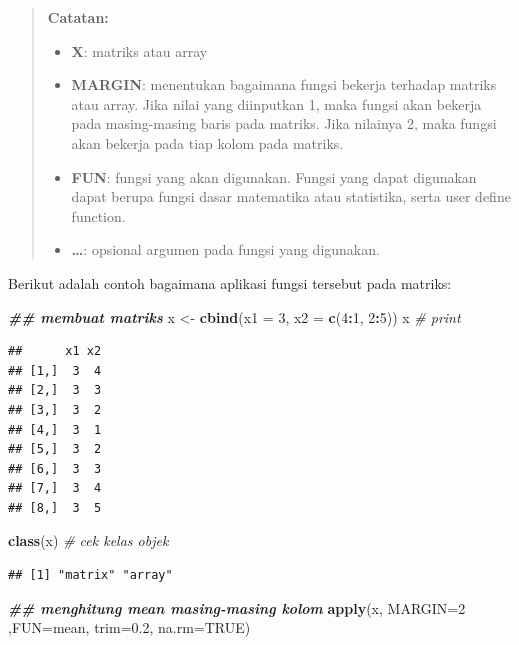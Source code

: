 \documentclass[
]{book}
\newenvironment{Shaded}{\begin{snugshade}}{\end{snugshade}}
\newcommand{\AttributeTok}[1]{\textcolor[rgb]{0.13,0.29,0.53}{#1}}
\newcommand{\CommentTok}[1]{\textcolor[rgb]{0.56,0.35,0.01}{\textit{#1}}}
\newcommand{\ConstantTok}[1]{\textcolor[rgb]{0.56,0.35,0.01}{#1}}
\newcommand{\DecValTok}[1]{\textcolor[rgb]{0.00,0.00,0.81}{#1}}
\newcommand{\DocumentationTok}[1]{\textcolor[rgb]{0.56,0.35,0.01}{\textbf{\textit{#1}}}}
\newcommand{\FloatTok}[1]{\textcolor[rgb]{0.00,0.00,0.81}{#1}}
\newcommand{\FunctionTok}[1]{\textcolor[rgb]{0.13,0.29,0.53}{\textbf{#1}}}
\newcommand{\NormalTok}[1]{#1}
\newcommand{\OtherTok}[1]{\textcolor[rgb]{0.56,0.35,0.01}{#1}}
\newcommand{\SpecialCharTok}[1]{\textcolor[rgb]{0.81,0.36,0.00}{\textbf{#1}}}
\providecommand{\tightlist}{%
  \setlength{\itemsep}{0pt}\setlength{\parskip}{0pt}}
\theoremstyle{definition}
\theoremstyle{definition}
\theoremstyle{definition}
\theoremstyle{definition}
\theoremstyle{remark}
\begin{document}
\begin{quote}
\textbf{Catatan:}

\begin{itemize}
\tightlist
\item
  \textbf{X}: matriks atau array
\item
  \textbf{MARGIN}: menentukan bagaimana fungsi bekerja terhadap matriks atau array. Jika nilai yang diinputkan 1, maka fungsi akan bekerja pada masing-masing baris pada matriks. Jika nilainya 2, maka fungsi akan bekerja pada tiap kolom pada matriks.
\item
  \textbf{FUN}: fungsi yang akan digunakan. Fungsi yang dapat digunakan dapat berupa fungsi dasar matematika atau statistika, serta user define function.
\item
  \textbf{\ldots{}}: opsional argumen pada fungsi yang digunakan.
\end{itemize}
\end{quote}

Berikut adalah contoh bagaimana aplikasi fungsi tersebut pada matriks:

\begin{Shaded}
\begin{Highlighting}[]
\DocumentationTok{\#\# membuat matriks}
\NormalTok{x }\OtherTok{\textless{}{-}} \FunctionTok{cbind}\NormalTok{(}\AttributeTok{x1 =} \DecValTok{3}\NormalTok{, }\AttributeTok{x2 =} \FunctionTok{c}\NormalTok{(}\DecValTok{4}\SpecialCharTok{:}\DecValTok{1}\NormalTok{, }\DecValTok{2}\SpecialCharTok{:}\DecValTok{5}\NormalTok{))}
\NormalTok{x }\CommentTok{\# print}
\end{Highlighting}
\end{Shaded}

\begin{verbatim}
##      x1 x2
## [1,]  3  4
## [2,]  3  3
## [3,]  3  2
## [4,]  3  1
## [5,]  3  2
## [6,]  3  3
## [7,]  3  4
## [8,]  3  5
\end{verbatim}

\begin{Shaded}
\begin{Highlighting}[]
\FunctionTok{class}\NormalTok{(x) }\CommentTok{\# cek kelas objek}
\end{Highlighting}
\end{Shaded}

\begin{verbatim}
## [1] "matrix" "array"
\end{verbatim}

\begin{Shaded}
\begin{Highlighting}[]
\DocumentationTok{\#\# menghitung mean masing{-}masing kolom}
\FunctionTok{apply}\NormalTok{(x, }\AttributeTok{MARGIN=}\DecValTok{2}\NormalTok{ ,}\AttributeTok{FUN=}\NormalTok{mean, }\AttributeTok{trim=}\FloatTok{0.2}\NormalTok{, }\AttributeTok{na.rm=}\ConstantTok{TRUE}\NormalTok{)}
\end{Highlighting}
\end{Shaded}
\end{document}
